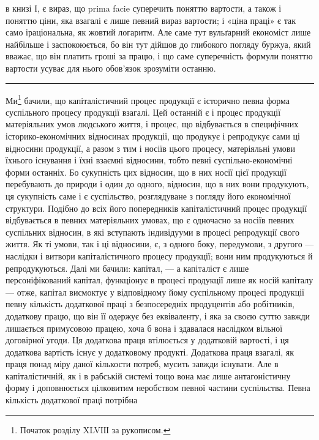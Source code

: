 \parcont{}  %
в книзі І, є вираз, що prima facie суперечить поняттю вартости, а також
і поняттю ціни, яка взагалі є лише певний вираз вартости; і «ціна праці»
є так само іраціональна, як жовтий логаритм. Але саме тут вульґарний
економіст лише найбільше і заспокоюється, бо він тут дійшов до глибокого погляду
буржуа, який вважає, що він платить гроші за працю, і що саме суперечність
формули поняттю вартости усуває для нього обов’язок зрозуміти останню.

\pfbreak

Ми\footnote{Початок розділу XLVІІІ за рукописом.} бачили, що капіталістичний процес продукції є історично певна
форма суспільного процесу продукції взагалі. Цей останній є і процес продукції
матеріяльних умов людського життя, і процес, що відбувається в специфічних
історико-економічних відносинах продукції, що продукує і репродукує сами
ці відносини продукції, а разом з тим і носіїв цього процесу, матеріяльні умови їхнього
існування і їхні взаємні відносини, тобто певні суспільно-економічні
форми останніх. Бо сукупність цих відносин, що в них носії цієї продукції перебувають
до природи і один до одного, відносин, що в них вони продукують, ця сукупність
саме і є суспільство, розглядуване з погляду його економічної структури.
Подібно до всіх його попередників капіталістичний процес продукції відбувається
в певних матеріяльних умовах, що є одночасно за носіїв певних суспільних
відносин, в які вступають індивідууми в процесі репродукції свого життя. Як
ті умови, так і ці відносини, є, з одного боку, передумови, з другого — наслідки
і витвори капіталістичного процесу продукції; вони ним продукуються й репродукуються.
Далі ми бачили: капітал, — а капіталіст є лише персоніфікований
капітал, функціонує в процесі продукції лише як носій капіталу — отже, капітал
висмоктує у відповідному йому суспільному процесі продукції певну кількість
додаткової праці з безпосередніх продуцентів або робітників, додаткову працю,
що він її одержує без еквіваленту, і яка за своєю суттю завжди лишається
примусовою працею, хоча б вона і здавалася наслідком вільної договірної угоди.
Ця додаткова праця втілюється у додатковій вартості, і ця додаткова вартість
існує у додатковому продукті. Додаткова праця взагалі, як праця понад міру
даної кількости потреб, мусить завжди існувати. Але в капіталістичній, як і в рабській
системі тощо вона має лише антагоністичну форму і доповнюється цілковитим
неробством певної частини суспільства. Певна кількість додаткової праці потрібна
